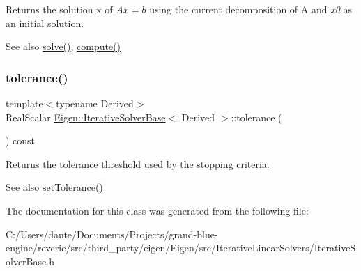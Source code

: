 \begin{DoxyReturn}{Returns}
the solution x of $ A x = b $ using the current decomposition of A and {\itshape x0} as an initial solution.
\end{DoxyReturn}
\begin{DoxySeeAlso}{See also}
\mbox{\hyperlink{class_eigen_1_1_sparse_solver_base_a4a66e9498b06e3ec4ec36f06b26d4e8f}{solve()}}, \mbox{\hyperlink{class_eigen_1_1_iterative_solver_base_a7dfa55c55e82d697bde227696a630914}{compute()}} 
\end{DoxySeeAlso}
\mbox{\label{class_eigen_1_1_iterative_solver_base_acb442c19b5858d6b9be813dd7d36cc62}} 
\subsubsection{\texorpdfstring{tolerance()}{tolerance()}}
{\footnotesize\ttfamily template$<$typename Derived$>$ \\
Real\+Scalar \mbox{\hyperlink{class_eigen_1_1_iterative_solver_base}{Eigen\+::\+Iterative\+Solver\+Base}}$<$ Derived $>$\+::tolerance (\begin{DoxyParamCaption}{ }\end{DoxyParamCaption}) const\hspace{0.3cm}{\ttfamily [inline]}}

\begin{DoxyReturn}{Returns}
the tolerance threshold used by the stopping criteria. 
\end{DoxyReturn}
\begin{DoxySeeAlso}{See also}
\mbox{\hyperlink{class_eigen_1_1_iterative_solver_base_ac160a444af8998f93da9aa30e858470d}{set\+Tolerance()}} 
\end{DoxySeeAlso}


The documentation for this class was generated from the following file\+:\begin{DoxyCompactItemize}
\item 
C\+:/\+Users/dante/\+Documents/\+Projects/grand-\/blue-\/engine/reverie/src/third\+\_\+party/eigen/\+Eigen/src/\+Iterative\+Linear\+Solvers/Iterative\+Solver\+Base.\+h\end{DoxyCompactItemize}
